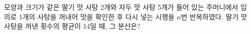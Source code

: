 모양과 크기가 같은 딸기 맛 사탕 2개와 자두 맛 사탕 5개가 들어 있는 주머니에서 임의로 1개의 사탕을 꺼내어 맛을 확인한 후 다시 넣는 시행을 $n$번 반복하였다. 딸기 맛 사탕을 꺼낸 횟수의 평균이 14일 때, 그 분산은?
